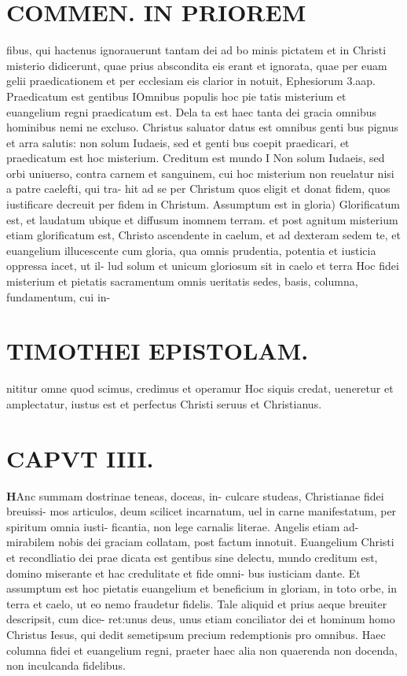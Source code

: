 \documentclass{article}
\begin{document}
\begin{pages}
\section*{COMMEN. IN PRIOREM }
\marginpar{[ p.92 ]}\pstart fibus, qui hactenus ignorauerunt tantam dei ad bo minis pictatem et in Christi misterio didicerunt, quae prius abscondita eis erant et ignorata, quae per euam gelii praedicationem et per ecclesiam eis clarior in notuit, Ephesiorum 3.aap.  \pend\pstart Praedicatum est gentibus IOmnibus populis hoc pie tatis misterium et euangelium regni praedicatum est. Dela ta est haec tanta dei gracia omnibus hominibus nemi ne excluso. Christus saluator datus est omnibus genti bus pignus et arra salutis: non solum Iudaeis, sed et genti bus coepit praedicari, et praedicatum est hoc misterium.  \pend\pstart Creditum est mundo I Non solum Iudaeis, sed orbi uniuerso, contra carnem et sanguinem, cui hoc misterium non reuelatur nisi a patre caelefti, qui tra- hit ad se per Christum quos eligit et donat fidem, quos iustificare decreuit per fidem in Christum.  \pend\pstart Assumptum est in gloria) Glorificatum est, et laudatum ubique et diffusum inomnem terram. et post agnitum misterium etiam glorificatum est, Christo ascendente in caelum, et ad dexteram sedem te, et euangelium illucescente cum gloria, qua omnis prudentia, potentia et iusticia oppressa iacet, ut il- lud solum et unicum gloriosum sit in caelo et terra Hoc fidei misterium et pietatis sacramentum omnis ueritatis sedes, basis, columna, fundamentum, cui in-  \pend
\section*{TIMOTHEI EPISTOLAM. }
\marginpar{[ p.93 ]}\pstart nititur omne quod scimus, credimus et operamur Hoc siquis credat, ueneretur et amplectatur, iustus est et perfectus Christi seruus et Christianus.  \pend
\endnumbering\beginnumbering\section{CAPVT IIII.}\pstart \huge\textbf{H}\normalsize Anc summam dostrinae teneas, doceas, in- culcare studeas, Christianae fidei breuissi- mos articulos, deum scilicet incarnatum, uel in carne manifestatum, per spiritum omnia iusti- ficantia, non lege carnalis literae. Angelis etiam ad- mirabilem nobis dei graciam collatam, post factum innotuit. Euangelium Christi et recondliatio dei prae dicata est gentibus sine delectu, mundo creditum est, domino miserante et hac credulitate et fide omni- bus iusticiam dante. Et assumptum est hoc pietatis euangelium et beneficium in gloriam, in toto orbe, in terra et caelo, ut eo nemo fraudetur fidelis. Tale aliquid et prius aeque breuiter descripsit, cum dice- ret:unus deus, unus etiam conciliator dei et hominum homo Christus Iesus, qui dedit semetipsum precium redemptionis pro omnibus. Haec columna fidei et euangelium regni, praeter haec alia non quaerenda non docenda, non inculcanda fidelibus.  \pend
{}
{}

\end{pages}
\end{document}
